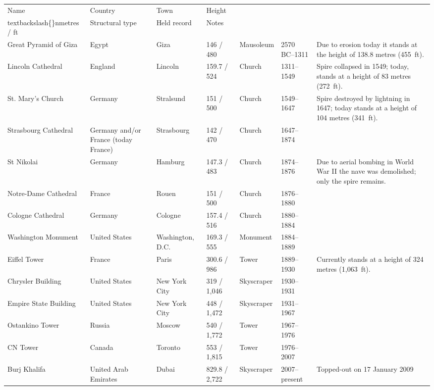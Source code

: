 \documentclass{article}
\begin{document}
\begin{tabular}{lllllll}
\toprule
Name & Country & Town & Height\\textbackslash\{\}nmetres / ft & Structural type & Held record & Notes \\
\midrule
Great Pyramid of Giza & Egypt & Giza & 146 / 480 & Mausoleum & 2570 BC–1311 & Due to erosion today it stands at the height of 138.8 metres (455 ft). \\
Lincoln Cathedral & England & Lincoln & 159.7 / 524 & Church & 1311–1549 & Spire collapsed in 1549; today, stands at a height of 83 metres (272 ft). \\
St. Mary's Church & Germany & Stralsund & 151 / 500 & Church & 1549–1647 & Spire destroyed by lightning in 1647; today stands at a height of 104 metres (341 ft). \\
Strasbourg Cathedral & Germany and/or France (today France) & Strasbourg & 142 / 470 & Church & 1647–1874 &  \\
St Nikolai & Germany & Hamburg & 147.3 / 483 & Church & 1874–1876 & Due to aerial bombing in World War II the nave was demolished; only the spire remains. \\
Notre-Dame Cathedral & France & Rouen & 151 / 500 & Church & 1876–1880 &  \\
Cologne Cathedral & Germany & Cologne & 157.4 / 516 & Church & 1880–1884 &  \\
Washington Monument & United States & Washington, D.C. & 169.3 / 555 & Monument & 1884–1889 &  \\
Eiffel Tower & France & Paris & 300.6 / 986 & Tower & 1889–1930 & Currently stands at a height of 324 metres (1,063 ft). \\
Chrysler Building & United States & New York City & 319 / 1,046 & Skyscraper & 1930–1931 &  \\
Empire State Building & United States & New York City & 448 / 1,472 & Skyscraper & 1931–1967 &  \\
Ostankino Tower & Russia & Moscow & 540 / 1,772 & Tower & 1967–1976 &  \\
CN Tower & Canada & Toronto & 553 / 1,815 & Tower & 1976–2007 &  \\
Burj Khalifa & United Arab Emirates & Dubai & 829.8 / 2,722 & Skyscraper & 2007–present & Topped-out on 17 January 2009 \\
\bottomrule
\end{tabular}
\end{document}
